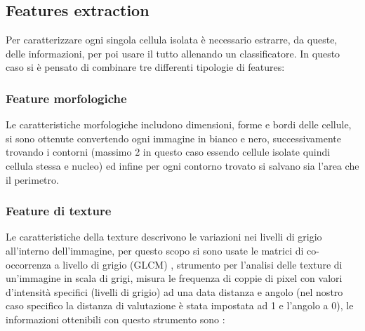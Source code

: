 \documentclass[italian,10pt,a4paper]{article}
\begin{document}
		\subsection{Features extraction}
			Per caratterizzare ogni singola cellula isolata è necessario estrarre, da queste, delle informazioni, per poi usare il tutto allenando un classificatore.
			\linebreak
			In questo caso si è pensato di combinare tre differenti tipologie di features:
			
				\subsubsection{Feature morfologiche}
					Le caratteristiche morfologiche includono dimensioni, forme e bordi delle cellule, si sono ottenute convertendo ogni immagine in bianco e nero, successivamente trovando i contorni (massimo 2 in questo caso essendo cellule isolate quindi cellula stessa e nucleo) ed infine per ogni contorno trovato si salvano sia l’area che il perimetro.
					
				\subsubsection{Feature di texture}
					Le caratteristiche della texture descrivono le variazioni nei livelli di grigio all'interno dell'immagine, per questo scopo si sono usate le matrici di co-occorrenza a livello di grigio (GLCM) \cite{liu_feature_2013}, strumento per l’analisi delle texture di un’immagine in scala di grigi, misura le frequenza di coppie di pixel con valori d’intensità specifici (livelli di grigio) ad una data distanza e angolo (nel nostro caso specifico la distanza di valutazione è stata impostata ad 1 e l'angolo a 0), le informazioni ottenibili con questo strumento sono :
					
\end{document}
